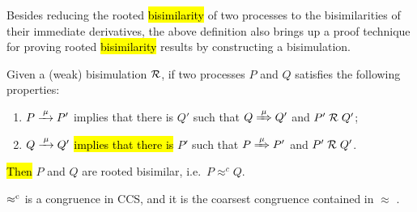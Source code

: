 Besides reducing the rooted \hl{bisimilarity} of two processes to
the bisimilarities of their immediate derivatives, the
above definition also brings up a proof technique for proving rooted
\hl{bisimilarity} results by constructing a bisimulation.
\begin{lemma}
\label{l:obsCongrByWeakBisim}
Given a (weak) bisimulation $\mathrel{\cal R}$, if two processes $P$ and $Q$
satisfies the following properties:
\begin{enumerate}
\item $P \arr\mu P'$ implies that there is $Q'$ such that $Q
   \Arr\mu Q'$ and $P' \mathrel{\cal R} Q'$;
\item $Q \arr\mu Q'$ \hl{implies that there is} $P'$ such that $P
   \Arr\mu P'$ and $P' \mathrel{\cal R} Q'$.
\end{enumerate}
\hl{Then} $P$ and $Q$ are rooted bisimilar, i.e.~$P \approx^c Q$.
\end{lemma}

\begin{theorem}
\label{t:rapproxCongruence}
$\mathrel{\approx^{\rm{c}}}$ is a congruence in CCS, and it is the
coarsest congruence contained in $\approx$ \cite{van2005characterisation}.
\end{theorem}
